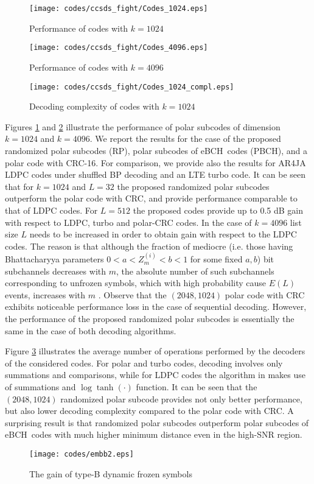 \documentclass[conference]{IEEEtran}
\theoremstyle{plain}
\begin{document}
\begin{figure}[t]
\texttt{[image: codes/ccsds\_fight/Codes\_1024.eps]}
\caption{Performance  of codes    with $k=1024 $}
\label{fPerf1024}
\end{figure}
\begin{figure}
\texttt{[image: codes/ccsds\_fight/Codes\_4096.eps]}
\caption{Performance of codes with $k=4096 $}
\label{fPerf4096}
\end{figure}
\begin{figure}
\texttt{[image: codes/ccsds\_fight/Codes\_1024\_compl.eps]}
\caption{Decoding complexity of codes  with  $k=1024 $}
\label{fPerf1024Compl}
\end{figure}
Figures \ref{fPerf1024} and \ref{fPerf4096} illustrate the performance of  polar subcodes of dimension $k=1024$ and $k=4096$.  We report the results for the case of the proposed randomized polar subcodes (RP), polar subcodes of eBCH\ codes (PBCH), and a polar code with  CRC-16.  For comparison, we provide also the results for AR4JA LDPC codes \cite{ccsds2011synccoding} under shuffled BP decoding \cite{zhang2005shuffled} and an LTE turbo code. It can be seen that for $k=1024$ and $L=32$ the proposed randomized polar subcodes outperform the polar code with CRC, and provide performance comparable to that of LDPC codes. For $L=512$ the proposed codes provide up to 0.5 dB gain with respect to LDPC, turbo and polar-CRC codes.  In the case of $k=4096$  list size $L$ needs to be increased in order to obtain gain with respect to the LDPC codes.  The reason is that  although the fraction of mediocre (i.e. those having Bhattacharyya parameters $0<a<Z_m^{(i)}<b<1$ for some fixed $a,b$)  bit subchannels decreases with $m$, the absolute number of such subchannels corresponding to unfrozen symbols, which with high probability cause $E(L)$ events, increases with $m$ \cite{hassani2014finitelength}. Observe that the $(2048,1024)$ polar code with CRC exhibits noticeable performance loss in the case of sequential decoding. However, the performance of the proposed randomized polar subcodes is essentially the same in the case of both decoding algorithms. 

Figure \ref{fPerf1024Compl} illustrates the average number of operations performed by the decoders  of the considered codes. For polar and turbo codes, decoding involves only summations and comparisons, while for LDPC codes the algorithm in \cite{zhang2005shuffled} makes use of  summations and $\log\tanh(\cdot)$ function. It can be seen that the $(2048,1024)$ randomized polar subcode provides not only better performance, but also lower decoding complexity compared to the polar code with CRC. A surprising result is that randomized polar subcodes outperform polar subcodes of eBCH\ codes with much higher minimum distance even in the high-SNR region.
\begin{figure}
\centering
\texttt{[image: codes/embb2.eps]}
\caption{The gain of type-B dynamic frozen symbols }
\label{fLDPCFight}
\end{figure}
\end{document}
